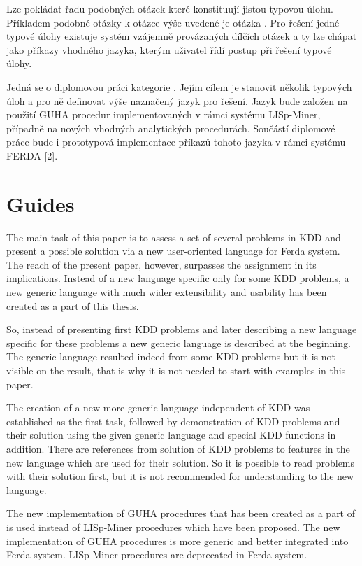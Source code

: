 \documentclass[a4paper,12pt]{book}
\begin{document}
Lze pokládat řadu podobných otázek které konstituují jistou typovou úlohu. Příkladem podobné otázky k otázce výše uvedené je otázka . Pro řešení jedné typové úlohy existuje systém vzájemně provázaných dílčích otázek a ty lze chápat jako příkazy vhodného jazyka, kterým uživatel řídí postup při řešení typové úlohy.

Jedná se o diplomovou práci kategorie . Jejím cílem je stanovit několik typových úloh a pro ně definovat výše naznačený jazyk pro řešení. Jazyk bude založen na použití GUHA procedur implementovaných v rámci systému LISp-Miner, případně na nových vhodných analytických procedurách. Součástí diplomové práce bude i prototypová implementace příkazů tohoto jazyka v rámci systému FERDA [2].

\section*{Guides}
The main task of this paper is to assess a set of several problems in KDD and present a possible solution via a new user-oriented language for Ferda system. The reach of the present paper, however, surpasses the assignment in its implications. Instead of a new language specific only for some KDD problems, a new generic language with much wider extensibility and usability has been created as a part of this thesis. 

So, instead of presenting first KDD problems and later describing a new language specific for these problems a new generic language is described at the beginning. The generic language resulted indeed from some KDD problems but it is not visible on the result, that is why it is not needed to start with examples in this paper.

The creation of a new more generic language independent of KDD was established as the first task, followed by demonstration of KDD problems and their solution using the given generic language and special KDD functions in addition. There are references from solution of KDD problems to features in the new language which are used for their solution. So it is possible to read problems with their solution first, but it is not recommended for understanding to the new language.

The new implementation of GUHA procedures that has been created as a part of \cite[diploma thesis of Tomáš Kuchař]{thesisKuchar} is used instead of LISp-Miner procedures which have been proposed. The new implementation of GUHA procedures is more generic and better integrated into Ferda system. LISp-Miner procedures are deprecated in Ferda system.
\end{document}
